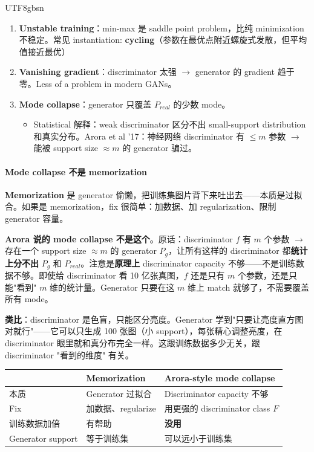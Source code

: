\documentclass[11pt]{article}
\begin{document}
\begin{CJK}{UTF8}{gbsn}
\begin{enumerate}
  \item \textbf{Unstable training}：min-max 是 saddle point problem，比纯 minimization 不稳定。常见 instantiation: \textbf{cycling}（参数在最优点附近螺旋式发散，但平均值接近最优）
  \item \textbf{Vanishing gradient}：discriminator 太强 $\to$ generator 的 gradient 趋于零。Less of a problem in modern GANs。
  \item \textbf{Mode collapse}：generator 只覆盖 $P_{real}$ 的少数 mode。
  \begin{itemize}
    \item Statistical 解释：weak discriminator 区分不出 small-support distribution 和真实分布。Arora et al '17：神经网络 discriminator 有 $\leq m$ 参数 $\to$ 能被 support size $\approx m$ 的 generator 骗过。
  \end{itemize}
\end{enumerate}

\paragraph{Mode collapse 不是 memorization}

\textbf{Memorization} 是 generator 偷懒，把训练集图片背下来吐出去——本质是过拟合。如果是 memorization，fix 很简单：加数据、加 regularization、限制 generator 容量。

\textbf{Arora 说的 mode collapse 不是这个}。原话：discriminator $f$ 有 $m$ 个参数 $\to$ 存在一个 support size $\approx m$ 的 generator $P_g$，让所有这样的 discriminator 都\textbf{统计上分不出} $P_g$ 和 $P_{real}$。注意是\textbf{原理上} discriminator capacity 不够——不是训练数据不够。即使给 discriminator 看 10 亿张真图，$f$ 还是只有 $m$ 个参数，还是只能"看到" $m$ 维的统计量。Generator 只要在这 $m$ 维上 match 就够了，不需要覆盖所有 mode。

\textbf{类比}：discriminator 是色盲，只能区分亮度。Generator 学到"只要让亮度直方图对就行"——它可以只生成 100 张图（小 support），每张精心调整亮度，在 discriminator 眼里就和真分布完全一样。这跟训练数据多少无关，跟 discriminator "看到的维度" 有关。

\begin{center}
\begin{tabular}{|l|l|l|}
\hline
 & \textbf{Memorization} & \textbf{Arora-style mode collapse} \\
\hline
本质 & Generator 过拟合 & Discriminator capacity 不够 \\
Fix & 加数据、regularize & 用更强的 discriminator class $F$ \\
训练数据加倍 & 有帮助 & \textbf{没用} \\
Generator support & 等于训练集 & 可以远小于训练集 \\
\hline
\end{tabular}
\end{center}


\end{CJK}
\end{document}

